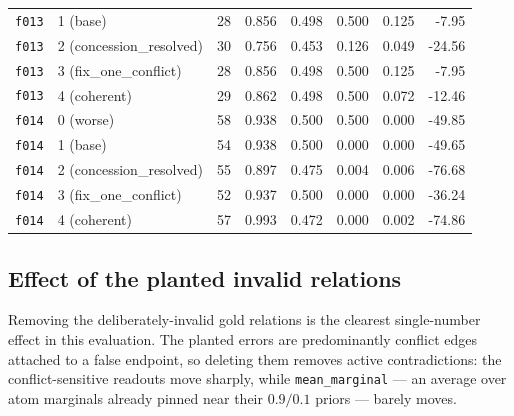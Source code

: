 \documentclass[11pt]{article}
\begin{document}
\begin{table}[htbp]
\begin{tabular}{llrrrrrr}
\texttt{f013} & 1 (base) & 28 & 0.856 & 0.498 & 0.500 & 0.125 & -7.95 \\
\texttt{f013} & 2 (concession\_resolved) & 30 & 0.756 & 0.453 & 0.126 & 0.049 & -24.56 \\
\texttt{f013} & 3 (fix\_one\_conflict) & 28 & 0.856 & 0.498 & 0.500 & 0.125 & -7.95 \\
\texttt{f013} & 4 (coherent) & 29 & 0.862 & 0.498 & 0.500 & 0.072 & -12.46 \\
\midrule
\texttt{f014} & 0 (worse) & 58 & 0.938 & 0.500 & 0.500 & 0.000 & -49.85 \\
\texttt{f014} & 1 (base) & 54 & 0.938 & 0.500 & 0.000 & 0.000 & -49.65 \\
\texttt{f014} & 2 (concession\_resolved) & 55 & 0.897 & 0.475 & 0.004 & 0.006 & -76.68 \\
\texttt{f014} & 3 (fix\_one\_conflict) & 52 & 0.937 & 0.500 & 0.000 & 0.000 & -36.24 \\
\texttt{f014} & 4 (coherent) & 57 & 0.993 & 0.472 & 0.000 & 0.002 & -74.86 \\
\bottomrule
\end{tabular}
\end{table}

\subsection{Effect of the planted invalid relations}

Removing the deliberately-invalid gold relations is the clearest single-number effect in this evaluation. The planted errors are predominantly conflict edges attached to a false endpoint, so deleting them removes active contradictions: the conflict-sensitive readouts move sharply, while \texttt{mean\_marginal} --- an average over atom marginals already pinned near their $0.9/0.1$ priors --- barely moves.
\end{document}
